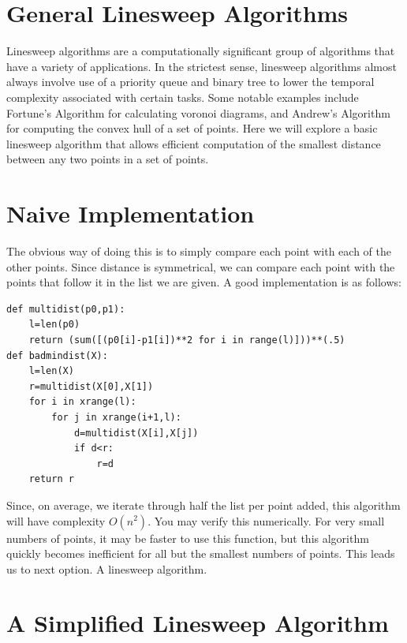 

\section*{General Linesweep Algorithms}

Linesweep algorithms are a computationally significant group of algorithms that have a variety of applications. In the strictest sense, linesweep algorithms almost always involve use of a priority queue and binary tree to lower the temporal complexity associated with certain tasks. Some notable examples include Fortune's Algorithm for calculating voronoi diagrams, and Andrew's Algorithm for computing the convex hull of a set of points. Here we will explore a basic linesweep algorithm that allows efficient computation of the smallest distance between any two points in a set of points. 

\section*{Naive Implementation}

The obvious way of doing this is to simply compare each point with each of the other points. Since distance is symmetrical, we can compare each point with the points that follow it in the list we are given. A good implementation is as follows:

\begin{lstlisting}
def multidist(p0,p1):
    l=len(p0)
    return (sum([(p0[i]-p1[i])**2 for i in range(l)]))**(.5)
def badmindist(X):
    l=len(X)
    r=multidist(X[0],X[1])
    for i in xrange(l):
        for j in xrange(i+1,l):
            d=multidist(X[i],X[j])
            if d<r:
                r=d
    return r
\end{lstlisting}

Since, on average, we iterate through half the list per point added, this algorithm will have complexity $O(n^2)$. You may verify this numerically. For very small numbers of points, it may be faster to use this function, but this algorithm quickly becomes inefficient for all but the smallest numbers of points. This leads us to next option. A linesweep algorithm.

\section*{A Simplified Linesweep Algorithm}


